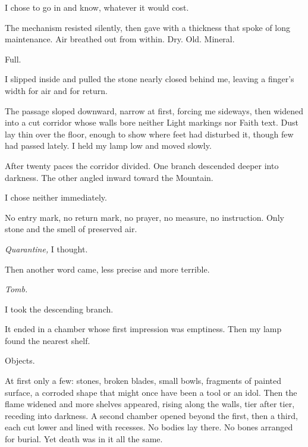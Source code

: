 I chose to go in and know, whatever it would cost.\par

The mechanism resisted silently, then gave with a thickness that spoke of long maintenance. Air breathed out from within. Dry. Old. Mineral.\par

Full.\par

I slipped inside and pulled the stone nearly closed behind me, leaving a finger's width for air and for return.\par

The passage sloped downward, narrow at first, forcing me sideways, then widened into a cut corridor whose walls bore neither Light markings nor Faith text. Dust lay thin over the floor, enough to show where feet had disturbed it, though few had passed lately. I held my lamp low and moved slowly.\par

After twenty paces the corridor divided. One branch descended deeper into darkness. The other angled inward toward the Mountain.\par

I chose neither immediately.\par

No entry mark, no return mark, no prayer, no measure, no instruction. Only stone and the smell of preserved air.\par

\textit{Quarantine,} I thought.\par

Then another word came, less precise and more terrible.\par

\textit{Tomb.}\par

I took the descending branch.\par

It ended in a chamber whose first impression was emptiness. Then my lamp found the nearest shelf.\par

Objects.\par

At first only a few: stones, broken blades, small bowls, fragments of painted surface, a corroded shape that might once have been a tool or an idol. Then the flame widened and more shelves appeared, rising along the walls, tier after tier, receding into darkness. A second chamber opened beyond the first, then a third, each cut lower and lined with recesses. No bodies lay there. No bones arranged for burial. Yet death was in it all the same.\par

